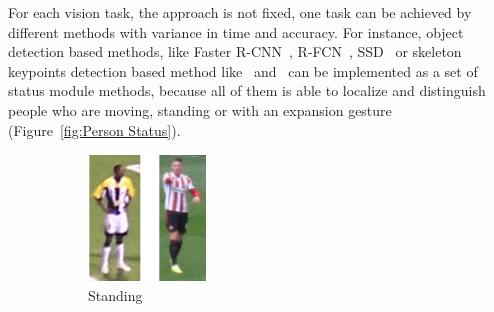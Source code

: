 For each vision task, the approach is not fixed, one task can be achieved by different methods with variance in time and accuracy. For instance, object detection based methods, like Faster R-CNN~\cite{Ren:2015:FRT:2969239.2969250}, R-FCN~\cite{DBLP:conf/nips/DaiLHS16}, SSD~\cite{DBLP:conf/eccv/LiuAESRFB16} or skeleton keypoints detection based method like~\cite{cao2017realtime} and~\cite{wei2016cpm} can be implemented as a set of status module methods, because all of them is able to localize and distinguish people who are moving, standing or with an expansion gesture (Figure~\ref{fig:Person Status}). 

\begin{figure}[thb]
\centering
        \begin{subfigure}[b]{0.088\textwidth}
                \includegraphics[width=\linewidth]{figure/stand1.png}
                \caption{Standing}
                \label{fig:gull}
        \end{subfigure}\quad
        \begin{subfigure}[b]{0.127\textwidth}

\end{subfigure}
\end{figure}
